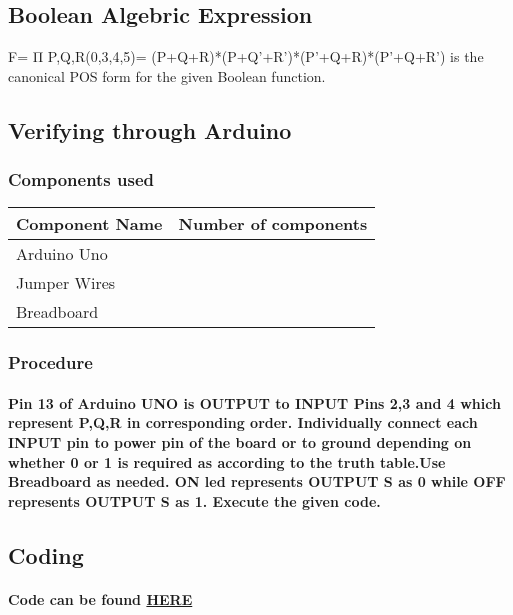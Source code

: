 \documentclass{article}
\begin{document}
\subsection*{Boolean Algebric Expression}
F= Π P,Q,R(0,3,4,5)= (P+Q+R)*(P+Q'+R')*(P'+Q+R)*(P'+Q+R')
is the canonical POS form for the given Boolean function.
\vspace{40px}
\\
\subsection*{Verifying through Arduino}
\subsubsection*{Components used}
\vspace{10px}
\begin{tabularx}{0.8\textwidth} { 
  | >{\centering\arraybackslash}X | 
  | >{\centering\arraybackslash}X  |
  }
 \hline
 Component Name & Number of components \\
 \hline
 Arduino Uno  & 1  \\
\hline
Jumper Wires  & 6  \\
\hline
Breadboard  & 1 \\
\hline
\end{tabularx}
\subsubsection*{Procedure}
\paragraph{Pin 13 of Arduino UNO is OUTPUT to INPUT Pins 2,3 and 4 which represent P,Q,R in corresponding order. Individually connect each INPUT pin to power pin of the board or to ground depending on whether 0 or 1 is required as according to the truth table.Use Breadboard as needed. ON led represents OUTPUT S as 0 while OFF represents OUTPUT S as 1. Execute the given code. }
\subsection*{Coding}
\paragraph{Code can be found \href {https://raw.githubusercontent.com/drigas7/FWC-ASSIGNMENT-1/main/code.cpp}{HERE}
}
\begin{Center}
\mbox{}
\vfill
{}
\end{Center}
\end{document}
